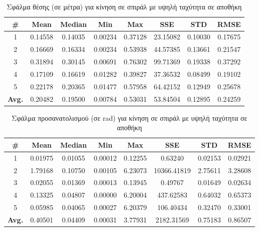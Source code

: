 \begin{table}[H]
    \begin{center}
        \centering
        \caption{Σφάλμα θέσης (σε μέτρα) για κίνηση σε σπιράλ με υψηλή ταχύτητα σε αποθήκη}
                \label{tab:position_error_spiral_fast_warehouse}
        \begin{tabular}{| c | c | c | c | c | c | c | c | }
        \hline
        \rowcolor{Gray}
        \# & Mean & Median & Min & Max & SSE & STD & RMSE \\
        \hline
        1 & 0.14558 & 0.14035 & 0.00234 & 0.37128 & 23.15082 & 0.10030 & 0.17675 \\
        2 & 0.16669 & 0.16334 & 0.00234 & 0.53938 & 44.57385 & 0.13661 & 0.21547 \\
        3 & 0.31894 & 0.30145 & 0.00691 & 0.76302 & 99.71369 & 0.19338 & 0.37292 \\
        4 & 0.17109 & 0.16619 & 0.01282 & 0.39827 & 37.36532 & 0.08499 & 0.19102 \\
        5 & 0.22178 & 0.20365 & 0.01477 & 0.57958 & 64.42152 & 0.12949 & 0.25678 \\
        \hline
        \textbf{Avg.} & 0.20482 & 0.19500 & 0.00784 & 0.53031 & 53.84504 & 0.12895 & 0.24259 \\
        \hline
        \end{tabular}
    \end{center}
\end{table}

\begin{table}[H]
    \begin{center}
        \centering
        \caption{Σφάλμα προσανατολισμού (σε rad) για κίνηση σε σπιράλ με υψηλή ταχύτητα σε αποθήκη}
        \label{tab:orientation_error_spiral_fast_warehouse}
        \begin{tabular}{| c | c | c | c | c | c | c | c | }
        \hline
        \rowcolor{Gray}
        \# & Mean & Median & Min & Max & SSE & STD & RMSE \\
        \hline
        1 & 0.01975 & 0.01055 & 0.00012 & 0.12255 & 0.63240 & 0.02153 & 0.02921 \\
        2 & 1.79168 & 0.10750 & 0.00105 & 6.23073 & 10366.41819 & 2.75611 & 3.28608 \\
        3 & 0.02055 & 0.01369 & 0.00013 & 0.13945 & 0.49767 & 0.01649 & 0.02634 \\
        4 & 0.13325 & 0.04807 & 0.00000 & 6.20004 & 437.62583 & 0.64032 & 0.65373 \\
        5 & 0.05985 & 0.04065 & 0.00027 & 6.20379 & 106.40434 & 0.32470 & 0.33001 \\
        \hline
        \textbf{Avg.} & 0.40501 & 0.04409 & 0.00031 & 3.77931 & 2182.31569 & 0.75183 & 0.86507 \\
        \hline
        \end{tabular}
    \end{center}
\end{table}

